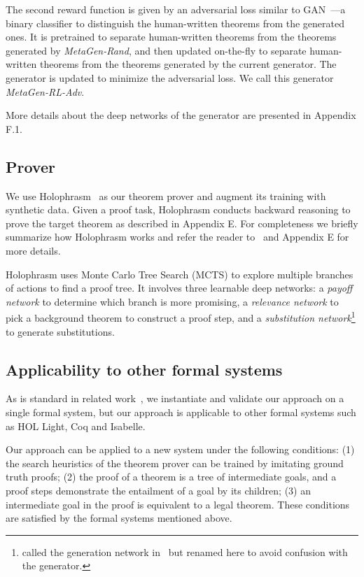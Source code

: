 \documentclass{article}
\begin{document}
The second reward function is given by an adversarial loss similar to GAN~\citep{goodfellow2014generative}---a binary classifier to distinguish the human-written theorems from the generated ones. 
It is pretrained to separate human-written theorems from the theorems generated by \emph{MetaGen-Rand},
and then updated on-the-fly to separate human-written theorems from the theorems 
generated by the current generator. The generator is updated to minimize the adversarial loss. 
We call this generator \emph{MetaGen-RL-Adv}.

More details about the deep networks of the generator are presented in Appendix F.1.

\subsection{Prover}
\label{sec:prover}
We use Holophrasm~\citep{whalen2016holophrasm} as our theorem prover and augment its training with synthetic data. 
Given a proof task,
Holophrasm conducts backward reasoning to prove the target theorem as described in Appendix E. For completeness we briefly summarize how Holophrasm works and refer the reader to~\citet{whalen2016holophrasm} and Appendix E for more details. 

Holophrasm uses Monte Carlo Tree Search (MCTS) to explore multiple branches of actions to find a proof tree.  It involves three learnable deep networks: a \emph{payoff network} to determine which branch is more promising, a \emph{relevance network} to pick a background theorem to construct a proof step, and a \emph{substitution network}\footnote{called the generation network in~\citet{whalen2016holophrasm} but renamed here  
to avoid confusion with the generator.} to generate substitutions.

\subsection{Applicability to other formal systems}
As is standard in related work~\cite{loos2017deep, irving2016deepmath, kaliszyk2018reinforcement, yang2019coqgym}, we instantiate and validate our approach on a single formal system, but our approach
 is applicable to other formal systems such as HOL Light, Coq and Isabelle. 

Our approach can be applied to a new system under the following conditions: (1) the search heuristics of the theorem prover can be trained by imitating ground truth proofs;
(2) the proof of a theorem is a tree of intermediate goals, 
and a proof steps demonstrate the entailment of a goal by its children;
(3) an intermediate goal in the proof is equivalent to a legal theorem.
These conditions are satisfied by the formal systems mentioned above.
\end{document}
